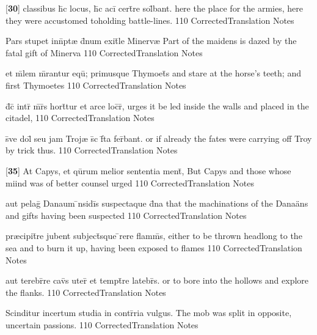 \latline
  {[\textbf{30}] classibus h\={\macron {\i}}c locus, h\={\macron {\i}}c aci\={} cert\={}re sol\={}bant.}
  { here the place for the armies, here they were accustomed toholding battle-lines. }
  {110}
  { CorrectedTranslation }
  { Notes }


\latline
  {Pars stupet inn\={}pt{\ae} d\={}num exit\={}le Minerv{\ae}}
  { Part of the maidens is dazed by the fatal gift of Minerva }
  {110}
  { CorrectedTranslation }
  { Notes }


\latline
  {et m\={}lem m\={\macron {\i}}rantur equ\={\macron {\i}}; primusque Thymoet\={}s}
  { and stare at the horse's teeth; and first Thymoetes  }
  {110}
  { CorrectedTranslation }
  { Notes }


\latline
  {d\={}c\={\macron {\i}} intr\={} m\={}r\={}s hort\={}tur et arce loc\={}r\={\macron {\i}},}
  { urges it be led inside the walls and placed in the citadel, }
  {110}
  { CorrectedTranslation }
  { Notes }


\latline
  {s\={\macron {\i}}ve dol\={} seu jam Troj{\ae} s\={\macron {\i}}c f\={}ta fer\={}bant.}
  { or if already  the fates were carrying off Troy by trick thus. }
  {110}
  { CorrectedTranslation }
  { Notes }


\latline
  {[\textbf{35}] At Capys, et qu\={}rum melior sententia ment\={\macron {\i}},}
  { But Capys and those whose miind was of better counsel urged }
  {110}
  { CorrectedTranslation }
  { Notes }


\latline
  {aut pelag\={} Danaum \={\macron {\i}}nsidi\={}s suspectaque d\={}na}
  { that the machinations of the Dana\"ans and gifts having been suspected }
  {110}
  { CorrectedTranslation }
  { Notes }


\latline
  {pr{\ae}cipit\={}re jubent subject\={\macron {\i}}sque \={}rere flamm\={\macron {\i}}s,}
  { either to be thrown headlong to the sea and to burn it up, having been exposed to flames }
  {110}
  { CorrectedTranslation }
  { Notes }


\latline
  {aut terebr\={}re cav\={}s uter\={\macron {\i}} et tempt\={}re latebr\={}s.}
  { or to bore into the hollows and explore the flanks. }
  {110}
  { CorrectedTranslation }
  { Notes }


\latline
  {Scinditur incertum studia in contr\={}ria vulgus.}
  { The mob was split in opposite, uncertain passions. }
  {110}
  { CorrectedTranslation }
  { Notes }


